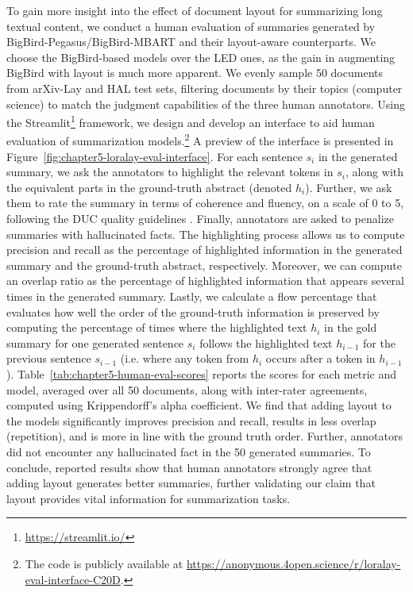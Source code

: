 To gain more insight into the effect of document layout for summarizing long textual content, we conduct a human evaluation of summaries generated by BigBird-Pegasus/BigBird-MBART and their layout-aware counterparts. We choose the BigBird-based models over the LED ones, as the gain in augmenting BigBird with layout is much more apparent. We evenly sample 50 documents from arXiv-Lay and HAL test sets, filtering documents by their topics (computer science) to match the judgment capabilities of the three human annotators. 
Using the Streamlit\footnote{\url{https://streamlit.io/}} framework, we design and develop an interface to aid human evaluation of summarization models.\footnote{The code is publicly available at \url{https://anonymous.4open.science/r/loralay-eval-interface-C20D}.} A preview of the interface is presented in Figure~\ref{fig:chapter5-loralay-eval-interface}.
For each sentence $s_i$ in the generated summary, we ask the annotators to highlight the relevant tokens in $s_i$, along with the equivalent parts in the ground-truth abstract (denoted $h_i$). Further, we ask them to rate the summary in terms of coherence and fluency, on a scale of 0 to 5, following the DUC quality guidelines \citep{dang2005overview}. Finally, annotators are asked to penalize summaries with hallucinated facts. The highlighting process allows us to compute precision and recall as the percentage of highlighted information in the generated summary and the ground-truth abstract, respectively. Moreover, we can compute an overlap ratio as the percentage of highlighted information that appears several times in the generated summary. Lastly, we calculate a flow percentage that evaluates how well the order of the ground-truth information is preserved by computing the percentage of times where the highlighted text $h_i$ in the gold summary for one generated sentence $s_i$ follows the highlighted text $h_{i-1}$ for the previous sentence $s_{i-1}$ (i.e. where any token from $h_i$ occurs after a token in $h_{i-1}$).
Table~\ref{tab:chapter5-human-eval-scores} reports the scores for each metric and model, averaged over all 50 documents, along with inter-rater agreements, computed using Krippendorff's alpha coefficient. We find that adding layout to the models significantly improves precision and recall, results in less overlap (repetition), and is more in line with the ground truth order. Further, annotators did not encounter any hallucinated fact in the 50 generated summaries. To conclude, reported results show that human annotators strongly agree that adding layout generates better summaries, further validating our claim that layout provides vital information for summarization tasks.

